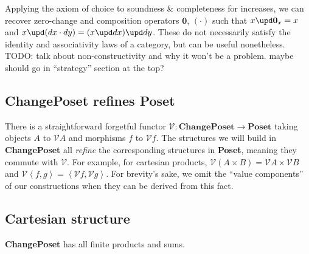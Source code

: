 \documentclass[nomarginums]{rntz}
\newcommand\todo[1]{{\color{Rhodamine}#1}}
\newcommand\cat\textbf
\newcommand\CP{\cat{ChangePoset}}
\newcommand\Poset{\cat{Poset}}
\newcommand\x\times
\newcommand\zero{\ensuremath{\mathbold{0}}}
\newcommand\vals[1]{#1^v} %
\newcommand\valfn{\vals{-}}
\newcommand\fork[1]{\langle{#1}\rangle}
\newcommand\Fork[1]{\left\langle{#1}\right\rangle}
\renewcommand\fork\Fork
\renewcommand\vals{\mathcal{V}}
\renewcommand\valfn\vals
\newcommand\funct[1]{\vals{#1}}
\begin{document}
Applying the axiom of choice to soundness \& completeness for increases, we can
recover zero-change and composition operators $\zero$, $(\cdot)$ such that $x
\upd \zero_x = x$ and $x \upd (dx \cdot dy) = (x \upd dx) \upd dy$. These
do not necessarily satisfy the identity and associativity laws of a category,
but can be useful nonetheless. \todo{TODO: talk about non-constructivity and why
  it won't be a problem. maybe should go in ``strategy'' section at the top?}


\subsection{\CP{} refines \Poset{}}
\label{sec:refines}

There is a straightforward forgetful functor $\valfn : \CP \to \Poset$ taking
objects $A$ to $\vals{A}$ and morphisms $f$ to $\funct f$. The structures we
will build in \CP{} all \emph{refine} the corresponding structures in \Poset{},
meaning they commute with $\valfn$. For example, for cartesian products,
$\vals{(A \x B)} = \vals{A} \x \vals{B}$ and $\funct{\fork{f,g}} = \fork{\funct
  f, \funct g}$. For brevity's sake, we omit the ``value components'' of our
constructions when they can be derived from this fact.


\subsection{Cartesian structure}

\begin{theorem}
  \CP{} has all finite products and sums.
\end{theorem}
\end{document}
